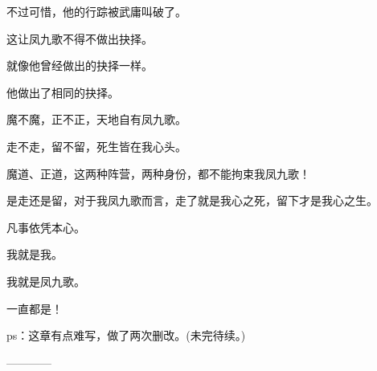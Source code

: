 \begin{this_body}
不过可惜，他的行踪被武庸叫破了。

这让凤九歌不得不做出抉择。

就像他曾经做出的抉择一样。

他做出了相同的抉择。

魔不魔，正不正，天地自有凤九歌。

走不走，留不留，死生皆在我心头。

魔道、正道，这两种阵营，两种身份，都不能拘束我凤九歌！

是走还是留，对于我凤九歌而言，走了就是我心之死，留下才是我心之生。

凡事依凭本心。

我就是我。

我就是凤九歌。

一直都是！

ps：这章有点难写，做了两次删改。(未完待续。)

------------

\end{this_body}

